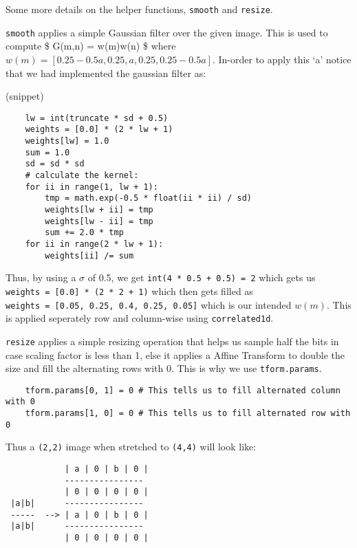\documentclass[11pt]{article}
\begin{document}
Some more details on the helper functions, \texttt{smooth} and
\texttt{resize}.

\texttt{smooth} applies a simple Gaussian filter over the given image.
This is used to compute \$ G(m,n) = w(m)w(n) \$ where
\(w(m) = [ 0.25 - 0.5a, 0.25, a, 0.25, 0.25 - 0.5a ]\). In-order to
apply this `a' notice that we had implemented the gaussian filter as:

(snippet)

\begin{verbatim}
    lw = int(truncate * sd + 0.5)
    weights = [0.0] * (2 * lw + 1)
    weights[lw] = 1.0
    sum = 1.0
    sd = sd * sd
    # calculate the kernel:
    for ii in range(1, lw + 1):
        tmp = math.exp(-0.5 * float(ii * ii) / sd)
        weights[lw + ii] = tmp
        weights[lw - ii] = tmp
        sum += 2.0 * tmp
    for ii in range(2 * lw + 1):
        weights[ii] /= sum
\end{verbatim}

Thus, by using a \(\sigma\) of 0.5, we get
\texttt{int(4\ *\ 0.5\ +\ 0.5)\ =\ 2} which gets us
\texttt{weights\ =\ {[}0.0{]}\ *\ (2\ *\ 2\ +\ 1)} which then gets
filled as \texttt{weights\ =\ {[}0.05,\ 0.25,\ 0.4,\ 0.25,\ 0.05{]}}
which is our intended \(w(m)\). This is applied seperately row and
column-wise using \texttt{correlated1d}.

\texttt{resize} applies a simple resizing operation that helps us sample
half the bits in case scaling factor is less than 1, else it applies a
Affine Transform to double the size and fill the alternating rows with
0. This is why we use \texttt{tform.params}.

\begin{verbatim}
    tform.params[0, 1] = 0 # This tells us to fill alternated column with 0
    tform.params[1, 0] = 0 # This tells us to fill alternated row with 0
\end{verbatim}

Thus a \texttt{(2,2)} image when stretched to \texttt{(4,4)} will look
like:

\begin{verbatim}
            | a | 0 | b | 0 |
            ----------------
            | 0 | 0 | 0 | 0 |
 |a|b|      ----------------
 -----  --> | a | 0 | b | 0 |
 |a|b|      ----------------
            | 0 | 0 | 0 | 0 |
\end{verbatim}
\end{document}
